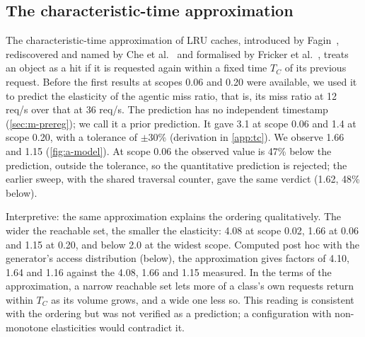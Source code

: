 \subsection{The characteristic-time approximation}\label{sec:m-tc}
The characteristic-time approximation of LRU caches, introduced by
Fagin~\cite{fagin1977}, rediscovered and named by Che et al.~\cite{che2002} and
formalised by Fricker et al.~\cite{fricker2012}, treats an object as a hit if it is
requested again within a fixed time $T_C$ of its previous request.
Before the first results at scopes 0.06 and 0.20 were available, we used it to predict
the elasticity of the agentic miss ratio, that is, its miss ratio at 12 req/s over that
at 36 req/s.
The prediction has no independent timestamp (\cref{sec:m-prereg}); we call it a prior
prediction.
It gave 3.1 at scope 0.06 and 1.4 at scope 0.20, with a tolerance of $\pm$30\%
(derivation in \cref{app:tc}).
We observe 1.66 and 1.15 (\cref{fig:a-model}).
At scope 0.06 the observed value is 47\% below the prediction, outside the tolerance, so
the quantitative prediction is rejected; the earlier sweep, with the shared traversal
counter, gave the same verdict (1.62, 48\% below).

Interpretive: the same approximation explains the ordering qualitatively.
The wider the reachable set, the smaller the elasticity: 4.08 at scope 0.02, 1.66 at 0.06
and 1.15 at 0.20, and below 2.0 at the widest scope.
Computed post hoc with the generator's access distribution (below), the approximation gives
factors of 4.10, 1.64 and 1.16 against the 4.08, 1.66 and 1.15 measured.
In the terms of the approximation, a narrow reachable set lets more of a class's own
requests return within $T_C$ as its volume grows, and a wide one less so.
This reading is consistent with the ordering but was not verified as a prediction; a
configuration with non-monotone elasticities would contradict it.

